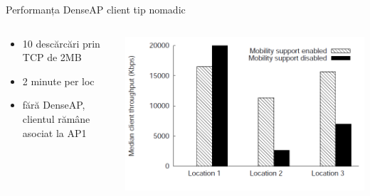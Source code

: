 \begin{frame}{Performanța DenseAP client tip nomadic}
  \begin{columns}
  \begin{column}{0.4\linewidth}
    \begin{itemize}
      \item 10 descărcări prin TCP de 2MB
      \item 2 minute per loc
      \item fără DenseAP, clientul rămâne asociat la AP1
    \end{itemize}
  \end{column}
  \begin{column}{0.6\linewidth}
    \includegraphics[scale=0.27]{img/fig21.png}
  \end{column}
  \end{columns}
\end{frame}
